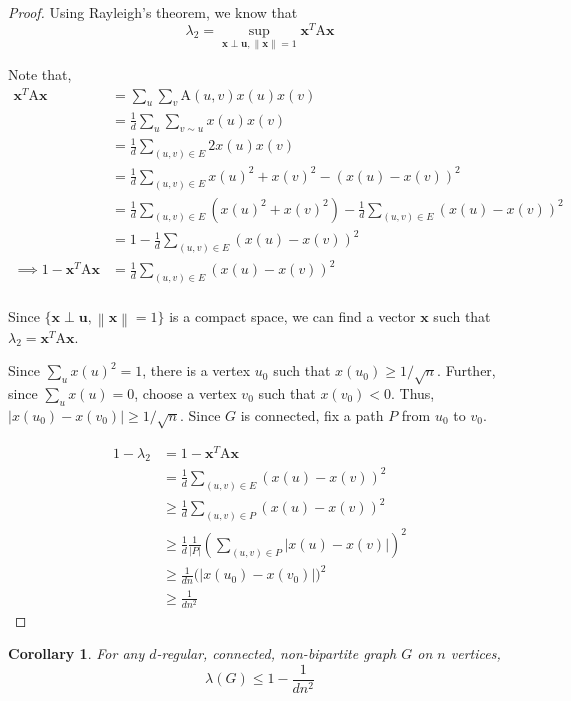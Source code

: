 \documentclass[10pt]{article}
\theoremstyle{plain}
\newtheorem{corollary}{Corollary}[theorem]
\theoremstyle{definition}
\newcommand{\norm}[1]{\left\lVert#1\right\rVert}
\begin{document}
\begin{proof}
Using Rayleigh's theorem, we know that
$$\lambda_2 = \sup_{\mathbf{x} \perp \mathbf{u}, \norm{\mathbf{x}} = 1} \mathbf{x}^T\mathrm{A}\mathbf{x}$$

Note that,
\begin{align*}
    \mathbf{x}^T\mathrm{A}\mathbf{x} &= \sum_u \sum_v \mathrm{A}(u,v)x(u)x(v) \\
    &= \frac1d \sum_u \sum_{v \sim u} x(u)x(v) \\
    &= \frac1d \sum_{(u,v) \in E} 2x(u)x(v) \\
    &= \frac1d \sum_{(u,v) \in E} x(u)^2 + x(v)^2 - (x(u) - x(v))^2 \\
    &= \frac1d \sum_{(u,v) \in E} (x(u)^2 + x(v)^2) - \frac1d \sum_{(u,v) \in E} (x(u) - x(v))^2 \\
    &= 1 - \frac1d \sum_{(u,v) \in E} (x(u) - x(v))^2 \\
    \implies 1 - \mathbf{x}^T\mathrm{A}\mathbf{x} &= \frac1d \sum_{(u,v) \in E} (x(u) - x(v))^2 \\
\end{align*}

Since $\{\mathbf{x} \perp \mathbf{u}, \norm{\mathbf{x}} = 1\}$ is a compact space, we can find a vector $\mathbf{x}$ such that $\lambda_2 = \mathbf{x}^T\mathrm{A}\mathbf{x}$.

Since $\sum_{u} x(u)^2 = 1$, there is a vertex $u_0$ such that $x(u_0) \geq 1/\sqrt{n}$. Further, since $\sum_u x(u) = 0$, choose a vertex $v_0$ such that $x(v_0) < 0$. Thus, $|x(u_0) - x(v_0)| \geq 1/\sqrt{n}$. Since $G$ is connected, fix a path $P$ from $u_0$ to $v_0$.

\begin{align*}
    1 - \lambda_2 &= 1 - \mathbf{x}^T\mathrm{A}\mathbf{x} \\ 
    &= \frac1d \sum_{(u,v) \in E} (x(u) - x(v))^2 \\
    &\geq \frac1d \sum_{(u,v) \in P} (x(u) - x(v))^2 \\
    &\geq \frac{1}{d} \frac{1}{|P|} \left(\sum_{(u,v) \in P} |x(u) - x(v)| \right)^2 \\
    &\geq \frac{1}{dn} \bigg(|x(u_0) - x(v_0)| \bigg)^2 \\
    &\geq \frac{1}{dn^2}
\end{align*}
\end{proof}

\begin{corollary}
For any $d$-regular, connected, non-bipartite graph $G$ on $n$ vertices, $$\lambda(G) \leq 1 - \frac{1}{dn^2}$$
\end{corollary}
\end{document}
